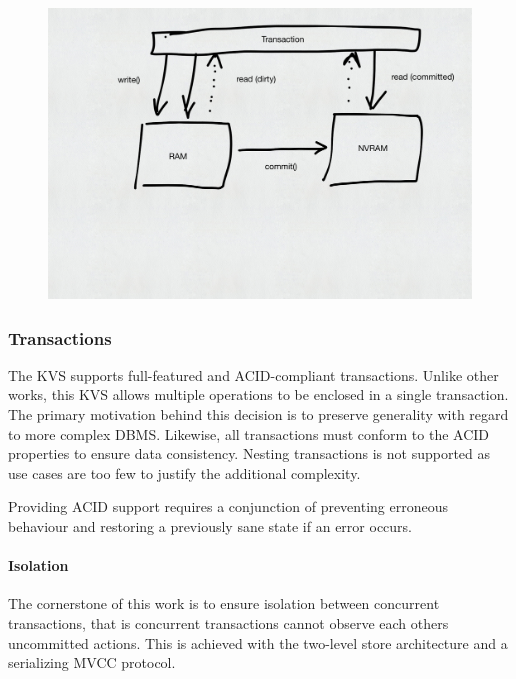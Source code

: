 
\begin{figure}[!ht]
    \centering
    \includegraphics[width=\textwidth]{figures/drafts/concept-sys-two-level-store.pdf}
    \caption{}
    \label{fig:concept-two-level-store}
\end{figure}

\subsubsection{Transactions}

The KVS supports full-featured and ACID-compliant transactions. Unlike other
works, this KVS allows multiple operations to be enclosed in a single
transaction. The primary motivation behind this decision is to preserve
generality with regard to more complex DBMS. Likewise, all transactions must
conform to the ACID properties to ensure data consistency. Nesting transactions
is not supported as use cases are too few to justify the additional complexity.

Providing ACID support requires a conjunction of preventing erroneous behaviour
and restoring a previously sane state if an error occurs.

\paragraph{Isolation}

The cornerstone of this work is to ensure isolation between concurrent
transactions, that is concurrent transactions cannot observe each others
uncommitted actions. This is achieved with the two-level store architecture and
a serializing MVCC protocol.

